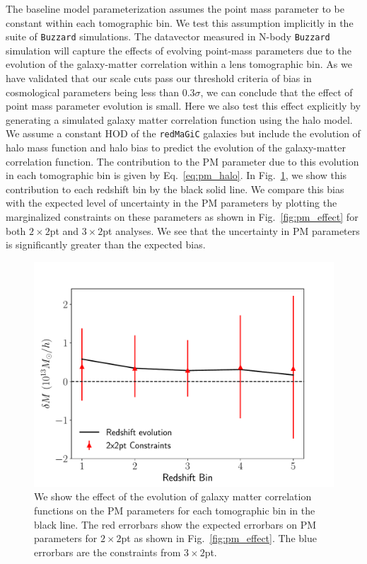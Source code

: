 \documentclass[aps, prd,twocolumn,superscriptaddress,nofootinbib,preprintnumbers]{revtex4-1}
\newcommand{\redmagic}{\texttt{redMaGiC} }
\newcommand{\buzzard}{\texttt{Buzzard} }
\begin{document}
The baseline model parameterization assumes the point mass parameter to be constant within each tomographic bin. We test this assumption implicitly in the suite of \buzzard simulations. The datavector measured in N-body \buzzard simulation will capture the effects of evolving point-mass parameters due to the evolution of the galaxy-matter correlation within a lens tomographic bin. As we have validated that our scale cuts pass our threshold criteria of bias in cosmological parameters being less than 0.3$\sigma$, we can conclude that the effect of point mass parameter evolution is small. Here we also test this effect explicitly by generating a simulated galaxy matter correlation function using the halo model. We assume a constant HOD of the \redmagic galaxies but include the evolution of halo mass function and halo bias to predict the evolution of the galaxy-matter correlation function. The contribution to the PM parameter due to this evolution in each tomographic bin is given by Eq.~\ref{eq:pm_halo}. In Fig.~\ref{fig:pm_evolve}, we show this contribution to each redshift bin by the black solid line. We compare this bias with the expected level of uncertainty in the PM parameters by plotting the marginalized constraints on these parameters as shown in Fig.~\ref{fig:pm_effect} for both $2\times2$pt and $3\times2$pt analyses. We see that the uncertainty in PM parameters is significantly greater than the expected bias. 


\begin{figure}
\includegraphics[width=\columnwidth]{figs/PM_evolve_impact.pdf}
\caption[]{We show the effect of the evolution of galaxy matter correlation functions on the PM parameters for each tomographic bin in the black line. The red errorbars show the expected errorbars on PM parameters for $2\times2$pt as shown in Fig.~\ref{fig:pm_effect}. The blue errorbars are the constraints from $3\times2$pt.
}
\label{fig:pm_evolve}
\end{figure}
\end{document}
